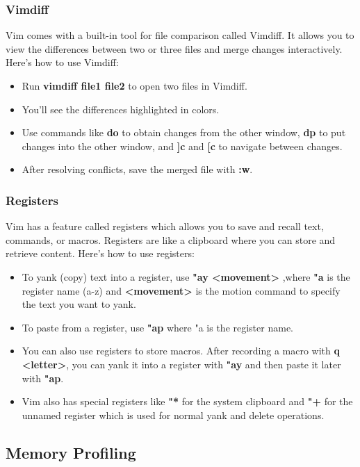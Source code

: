 \documentclass[titlepage]{article}
\begin{document}
\subsubsection{Vimdiff}
Vim comes with a built-in tool for file comparison called Vimdiff. It allows you to view the differences between two or three files and merge changes interactively. Here's how to use Vimdiff:

\begin{itemize}
\item Run \textbf{vimdiff file1 file2} to open two files in Vimdiff.
\item You'll see the differences highlighted in colors.
\item Use commands like \textbf{do} to obtain changes from the other window, \textbf{dp} to put changes into the other window, and\textbf{ ]c} and \textbf{[c} to navigate between changes.
\item After resolving conflicts, save the merged file with \textbf{:w}.
\end{itemize}

\subsubsection{Registers}
Vim has a feature called registers which allows you to save and recall text, commands, or macros. Registers are like a clipboard where you can store and retrieve content. Here's how to use registers:

\begin{itemize}
\item To yank (copy) text into a register, use \textbf{"ay <movement>} ,where \textbf{"a} is the register name (a-z) and \textbf{<movement>} is the motion command to specify the text you want to yank.
\item To paste from a register, use \textbf{"ap} where "a is the register name.
\item You can also use registers to store macros. After recording a macro with \textbf{q <letter>}, you can yank it into a register with \textbf{"ay} and then paste it later with \textbf{"ap}.
\item Vim also has special registers like \textbf{"*} for the system clipboard and \textbf{"+} for the unnamed register which is used for normal yank and delete operations.
\end{itemize}

\subsection{Memory Profiling}
\end{document}
